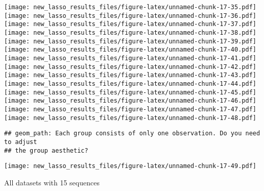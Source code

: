 \documentclass[
]{article}
\newenvironment{Shaded}{\begin{snugshade}}{\end{snugshade}}
\newcommand{\DataTypeTok}[1]{\textcolor[rgb]{0.13,0.29,0.53}{#1}}
\newcommand{\DecValTok}[1]{\textcolor[rgb]{0.00,0.00,0.81}{#1}}
\newcommand{\KeywordTok}[1]{\textcolor[rgb]{0.13,0.29,0.53}{\textbf{#1}}}
\newcommand{\NormalTok}[1]{#1}
\newcommand{\OperatorTok}[1]{\textcolor[rgb]{0.81,0.36,0.00}{\textbf{#1}}}
\newcommand{\StringTok}[1]{\textcolor[rgb]{0.31,0.60,0.02}{#1}}
\begin{document}
\texttt{[image: new\_lasso\_results\_files/figure-latex/unnamed-chunk-17-35.pdf]}
\texttt{[image: new\_lasso\_results\_files/figure-latex/unnamed-chunk-17-36.pdf]}
\texttt{[image: new\_lasso\_results\_files/figure-latex/unnamed-chunk-17-37.pdf]}
\texttt{[image: new\_lasso\_results\_files/figure-latex/unnamed-chunk-17-38.pdf]}
\texttt{[image: new\_lasso\_results\_files/figure-latex/unnamed-chunk-17-39.pdf]}
\texttt{[image: new\_lasso\_results\_files/figure-latex/unnamed-chunk-17-40.pdf]}
\texttt{[image: new\_lasso\_results\_files/figure-latex/unnamed-chunk-17-41.pdf]}
\texttt{[image: new\_lasso\_results\_files/figure-latex/unnamed-chunk-17-42.pdf]}
\texttt{[image: new\_lasso\_results\_files/figure-latex/unnamed-chunk-17-43.pdf]}
\texttt{[image: new\_lasso\_results\_files/figure-latex/unnamed-chunk-17-44.pdf]}
\texttt{[image: new\_lasso\_results\_files/figure-latex/unnamed-chunk-17-45.pdf]}
\texttt{[image: new\_lasso\_results\_files/figure-latex/unnamed-chunk-17-46.pdf]}
\texttt{[image: new\_lasso\_results\_files/figure-latex/unnamed-chunk-17-47.pdf]}
\texttt{[image: new\_lasso\_results\_files/figure-latex/unnamed-chunk-17-48.pdf]}

\begin{verbatim}
## geom_path: Each group consists of only one observation. Do you need to adjust
## the group aesthetic?
\end{verbatim}

\texttt{[image: new\_lasso\_results\_files/figure-latex/unnamed-chunk-17-49.pdf]}

All datasets with 15 sequences

\begin{Shaded}
\end{Shaded}
\end{document}
